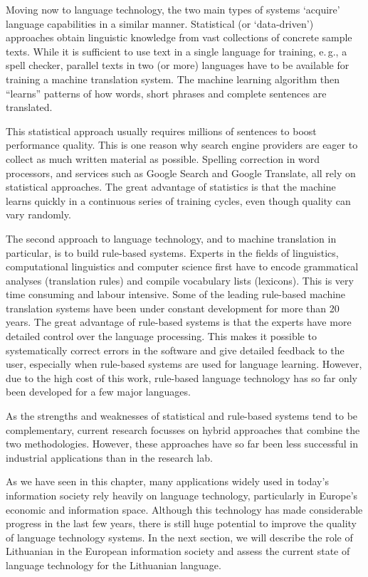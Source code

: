 \documentclass[]{../metanetpaper}
\begin{document}
\begin{multicols}{2}
Moving now to language technology, the two main types of systems ‘acquire’ language capabilities in a similar manner. Statistical (or ‘data-driven’) approaches obtain linguistic knowledge from vast collections of concrete sample texts. While it is sufficient to use text in a single language for training, e.\,g., a spell checker, parallel texts in two (or more) languages have to be available for training a machine translation system. The machine learning algorithm then “learns” patterns of how words, short phrases and complete sentences are translated. 

This statistical approach usually requires millions of sentences to boost performance quality. This is one reason why search engine providers are eager to collect as much written material as possible. Spelling correction in word processors, and services such as Google Search and Google Translate, all rely on statistical approaches. The great advantage of statistics is that the machine learns quickly in a continuous series of training cycles, even though quality can vary randomly.

The second approach to language technology, and to machine translation in particular, is to build rule-based systems. Experts in the fields of linguistics, computational linguistics and computer science first have to encode grammatical analyses (translation rules) and compile vocabulary lists (lexicons). This is very time consuming and labour intensive. Some of the leading rule-based machine translation systems have been under constant development for more than 20 years. The great advantage of rule-based systems is that the experts have more detailed control over the language processing. This makes it possible to systematically correct errors in the software and give detailed feedback to the user, especially when rule-based systems are used for language learning. However, due to the high cost of this work, rule-based language technology has so far only been developed for a few major languages. 


As the strengths and weaknesses of statistical and rule-based systems tend to be complementary, current research focusses on hybrid approaches that combine the two methodologies. However, these approaches have so far been less successful in industrial applications than in the research lab. 

As we have seen in this chapter, many applications widely used in today’s information society rely heavily on language technology, particularly in Europe’s economic and information space. Although this technology has made considerable progress in the last few years, there is still huge potential to improve the quality of language technology systems. In the next section, we will describe the role of Lithuanian in the European information society and assess the current state of language technology for the Lithuanian language.
\end{multicols}
\end{document}
